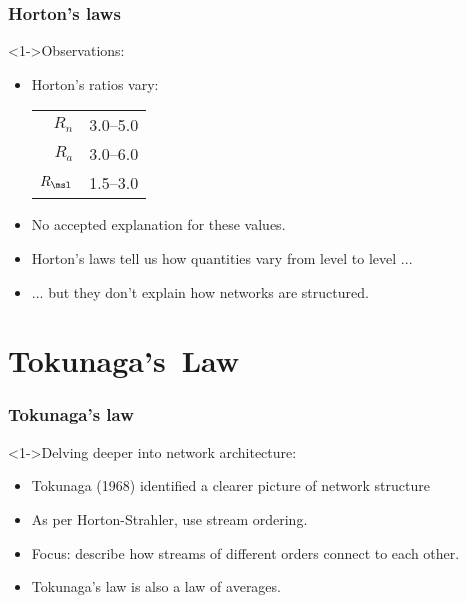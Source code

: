 \begin{frame}[label=]
  \frametitle{Horton's laws}

  \begin{block}<1->{Observations:}
    \begin{itemize}
    \item<1-> Horton's ratios vary:
      \begin{center}
        \settablerowcolours
        \begin{tabular}{rl}
          $R_n$               & 3.0--5.0 \\
          $R_a$               & 3.0--6.0 \\
          $R_\msl$               & 1.5--3.0 \\
        \end{tabular}
      \end{center}
    \item<2-> No accepted explanation for these values.
    \item<3-> Horton's laws tell us how quantities vary
      from level to level ...
    \item<4-> ... but they don't explain how networks
      are structured.
    \end{itemize}
  \end{block}

\end{frame}

\section{Tokunaga's\ Law}

\begin{frame}[label=]
  \frametitle{Tokunaga's law}

  \begin{block}<1->{Delving deeper into network architecture:}
    \begin{itemize}
    \item<2-> Tokunaga (1968) identified a clearer picture of network structure\cite{tokunaga1966a,tokunaga1978a,tokunaga1984a}
    \item<3-> As per Horton-Strahler, use \alert{stream ordering}.
    \item<4-> \alert{Focus:} describe how streams of different orders connect to each other.
    \item<5-> Tokunaga's law is also a law of averages.
    \end{itemize}
  \end{block}

\end{frame}


